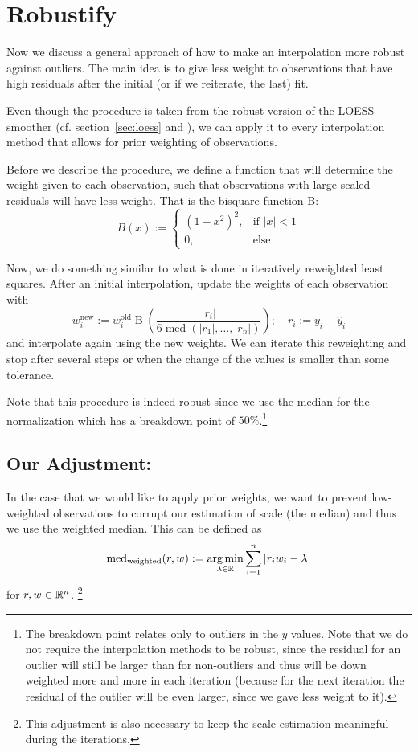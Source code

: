 \section{Robustify}{
	\label{sec:loess_robustify}
	{ %
		Now we discuss a general approach of how to make an interpolation more robust against outliers. The main idea is to give less weight to observations that have high residuals after the initial (or if we reiterate, the last) fit.

		Even though the procedure is taken from the robust version of the LOESS smoother (cf. section~\ref{sec:loess} and \cite{clevelandRobustLocallyWeighted1979}), we can apply it to every interpolation method that allows for prior weighting of observations.
	}
	
	{	
		Before we describe the procedure, we define a function that will determine the weight given to each observation, such that observations with large-scaled residuals will have less weight. That is the bisquare function B:
		$$
			B(x):=\begin{cases}
				\left(1-x^{2}\right)^{2}, & \text{if } |x|<1 \\
				0,                        & \text{else }
			\end{cases}
		$$

		Now, we do something similar to what is done in iteratively reweighted least squares. After an initial interpolation, update the weights of each observation with
		\begin{equation}
			w_i^\text{new}:=w_i^\text{old} \operatorname{B}\left(\frac{|r_i|}{6\operatorname{med}\left(|r_1|,\dots,|r_n|\right)}\right);\quad
			r_i := y_i - \hat y_i
			\label{eq:bisquare}
		\end{equation}
		and interpolate again using the new weights. We can iterate this reweighting and stop after several steps or when the change of the values is smaller than some tolerance.
	}

	Note that this procedure is indeed robust since we use the median for the normalization which has a breakdown point of $50 \%$.\footnote{The breakdown point relates only to outliers in the $y$ values. Note that we do not require the interpolation methods to be robust, since the residual for an outlier will  still be larger than for non-outliers and thus will be down weighted more and more in each iteration (because for the next iteration the residual of the outlier will be even larger, since we gave less weight to it).}
	\subsection{Our Adjustment:}{ 
		In the case that we would like to apply prior weights, we want to prevent low-weighted observations to corrupt our estimation of scale (the median) and thus we use the weighted median. This can be defined as
		$$
			\operatorname{med}_\text{weighted}(r,w) := \operatorname*{arg\, min}_{\lambda \in \mathbb{R}} \sum_{i=1}^n |r_iw_i -\lambda|
		$$
		for $r,w\in \mathbb{R}^n$. \footnote{This adjustment is also necessary to keep the scale estimation meaningful during the iterations.}
	}
}
